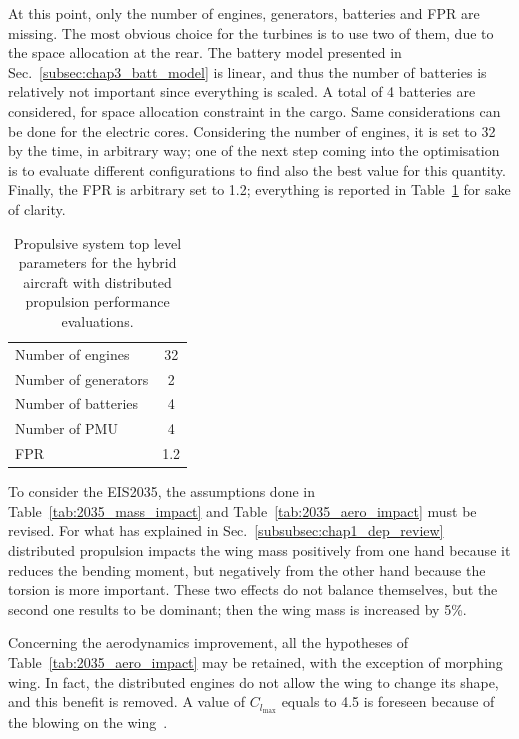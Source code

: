 At this point, only the number of engines, generators, batteries and FPR are missing. 
The most obvious choice for the turbines is to use two of them, due to the space allocation at the rear. 
The battery model presented in Sec.~\ref{subsec:chap3_batt_model} is linear, and thus the number of batteries is relatively not important since everything is scaled. 
A total of 4 batteries are considered, for space allocation constraint in the cargo. 
Same considerations can be done for the electric cores. 
Considering the number of engines, it is set to 32 by the time, in arbitrary way; one of the next step coming into the optimisation is to evaluate different configurations to find also the best value for this quantity. 
Finally, the FPR is arbitrary set to 1.2; everything is reported in Table~\ref{tab:prop_system_geom_param} for sake of clarity. 
\begin{table}[!h]
	\centering
	\begin{tabular}{l c}
		\hline
		Number of engines & 32 \\
		Number of generators & 2 \\ 
		Number of batteries & 4 \\
		Number of PMU & 4 \\
		FPR & 1.2 \\
		\hline
	\end{tabular}
	\caption{Propulsive system top level parameters for the hybrid aircraft with distributed propulsion performance evaluations.}
	\label{tab:prop_system_geom_param}
\end{table}

To consider the EIS2035, the assumptions done in Table~\ref{tab:2035_mass_impact} and Table~\ref{tab:2035_aero_impact} must be revised. 
For what has explained in Sec.~\ref{subsubsec:chap1_dep_review} distributed propulsion impacts the wing mass positively from one hand because it reduces the bending moment, but negatively from the other hand because the torsion is more important. 
These two effects do not balance themselves, but the second one results to be dominant; then the wing mass is increased by 5\%. 

Concerning the aerodynamics improvement, all the hypotheses of Table~\ref{tab:2035_aero_impact} may be retained, with the exception of morphing wing. 
In fact, the distributed engines do not allow the wing to change its shape, and this benefit is removed. 
A value of $C_{l_{\max}}$ equals to 4.5 is foreseen because of the blowing on the wing~\cite{bib:ampere_ref, bib:deere_2017b}.

